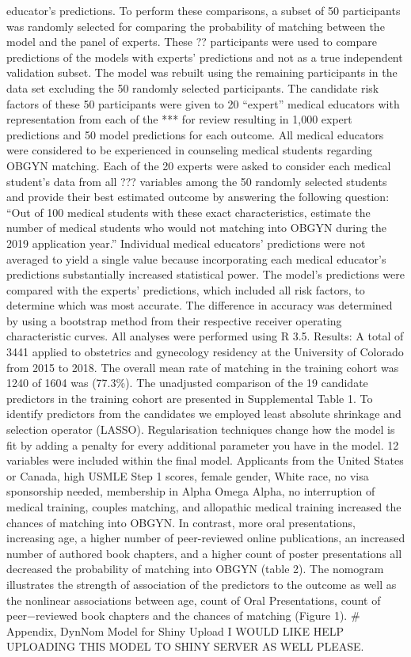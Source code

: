 \documentclass[12pt,]{article}
\begin{document}
educator's predictions. To perform these comparisons, a subset of 50
participants was randomly selected for comparing the probability of
matching between the model and the panel of experts. These ??
participants were used to compare predictions of the models with
experts' predictions and not as a true independent validation subset.
The model was rebuilt using the remaining participants in the data set
excluding the 50 randomly selected participants. The candidate risk
factors of these 50 participants were given to 20 ``expert'' medical
educators with representation from each of the *** for review resulting
in 1,000 expert predictions and 50 model predictions for each outcome.
All medical educators were considered to be experienced in counseling
medical students regarding OBGYN matching. Each of the 20 experts were
asked to consider each medical student's data from all ??? variables
among the 50 randomly selected students and provide their best estimated
outcome by answering the following question: ``Out of 100 medical
students with these exact characteristics, estimate the number of
medical students who would not matching into OBGYN during the 2019
application year.'' Individual medical educators' predictions were not
averaged to yield a single value because incorporating each medical
educator's predictions substantially increased statistical power. The
model's predictions were compared with the experts' predictions, which
included all risk factors, to determine which was most accurate. The
difference in accuracy was determined by using a bootstrap method from
their respective receiver operating characteristic curves. All analyses
were performed using R 3.5. Results: A total of 3441 applied to
obstetrics and gynecology residency at the University of Colorado from
2015 to 2018. The overall mean rate of matching in the training cohort
was 1240 of 1604 was (77.3\%). The unadjusted comparison of the 19
candidate predictors in the training cohort are presented in
Supplemental Table 1. To identify predictors from the candidates we
employed least absolute shrinkage and selection operator (LASSO).
Regularisation techniques change how the model is fit by adding a
penalty for every additional parameter you have in the model. 12
variables were included within the final model. Applicants from the
United States or Canada, high USMLE Step 1 scores, female gender, White
race, no visa sponsorship needed, membership in Alpha Omega Alpha, no
interruption of medical training, couples matching, and allopathic
medical training increased the chances of matching into OBGYN. In
contrast, more oral presentations, increasing age, a higher number of
peer-reviewed online publications, an increased number of authored book
chapters, and a higher count of poster presentations all decreased the
probability of matching into OBGYN (table 2). The nomogram illustrates
the strength of association of the predictors to the outcome as well as
the nonlinear associations between age, count of Oral Presentations,
count of peer−reviewed book chapters and the chances of matching (Figure
1). \# Appendix, DynNom Model for Shiny Upload I WOULD LIKE HELP
UPLOADING THIS MODEL TO SHINY SERVER AS WELL PLEASE.
\end{document}
